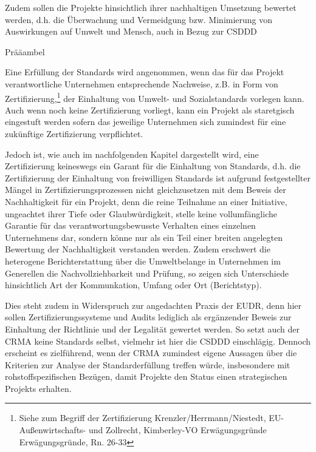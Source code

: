 \documentclass[12pt,a4paper,oneside]{book} %
\begin{document}
Zudem sollen die Projekte hinsichtlich ihrer nachhaltigen Umsetzung bewertet werden, d.h. die Überwachung und Vermeidgung bzw. Minimierung von Auswirkungen auf Umwelt und Mensch, auch in Bezug zur CSDDD

Prääambel

Eine Erfüllung der Standards wird angenommen, wenn das für das Projekt verantwortliche Unternehmen entsprechende Nachweise, z.B. in Form von Zertifizierung,\footnote{Siehe zum Begriff der Zertifizierung Krenzler/Herrmann/Niestedt, EU-Außenwirtschafts- und Zollrecht, Kimberley-VO Erwägungsgründe Erwägungsgründe, Rn. 26-33} der Einhaltung von Umwelt- und Sozialstandards vorlegen kann. Auch wenn noch keine Zertifizierung vorliegt, kann ein Projekt als staretgisch eingestuft werden sofern das jeweilige Unternehmen sich zumindest für eine zukünftige Zertifizierung verpflichtet.

Jedoch ist, wie auch im nachfolgenden Kapitel dargestellt wird, eine Zertifizierung keineswegs ein Garant für die Einhaltung von Standards, d.h. die Zertifizierung der Einhaltung von freiwilligen Standards ist aufgrund festgestellter Mängel in Zertifizierungsprozessen\autocite{Menschenrechtsfitness von Audits und Zertifizierern?, ECCHR, 2021} nicht gleichzusetzen mit dem Beweis der Nachhaltigkeit für ein Projekt, denn die reine Teilnahme an einer Initiative, ungeachtet ihrer Tiefe oder Glaubwürdigkeit, stelle keine vollumfängliche Garantie für das verantwortungsbewusste Verhalten eines einzelnen Unternehmens dar, sondern könne nur als ein Teil einer breiten angelegten Bewertung der Nachhaltigkeit verstanden werden.\autocites{OECD (2022), The role of sustainability initiatives in mandatory due	diligence: Background note on Regulatory Developments concerning Due Diligence for Responsible Business Conduct ,}[mit Hinweis auf die divergierenden Standards bei freiwilliger Zertifizierung]{https://www.transportenvironment.org/articles/the-critical-raw-materials-act-eus-attempt-to-have-quality-and-speed} Zudem erschwert die heterogene Berichterstattung über die Umweltbelange in Unternehmen im Generellen die Nachvollziehbarkeit und Prüfung, so zeigen sich Unterschiede hinsichtlich Art der Kommunkation, Umfang oder Ort (Berichtstyp).\autocite{Hosp: Status Quo der Berichterstattung über Umweltbelange und deren Prüfung, WPg 2023, 1308, 1314-1315}

Dies steht zudem in Widerspruch zur angedachten Praxis der EUDR, denn hier sollen Zertifizierungssysteme und Audits lediglich als ergänzender Beweis zur Einhaltung der Richtlinie und der Legalität gewertet werden.\autocite{Hörnig: Die Verordnung (EU) 2023/1115 über entwaldungsfreie Lieferketten und deren Compliance-Anforderungen; CB 2024, 119, 122}
So setzt auch der CRMA keine Standards selbst, vielmehr ist hier die CSDDD einschlägig. Dennoch erscheint es zielführend, wenn der CRMA zumindest eigene Aussagen über die Kriterien zur Analyse der Standarderfüllung treffen würde, insbesondere mit rohstoffspezifischen Bezügen, damit Projekte den Status einen strategischen Projekts erhalten.
\end{document}
